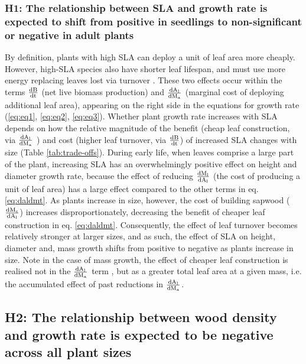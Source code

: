 \documentclass[a4paper,11pt]{article}
\begin{document}
\subsubsection*{H1: The relationship between SLA and growth rate is expected to shift from positive in seedlings to non-significant or negative in adult plants}

By definition, plants with high SLA can deploy a unit of leaf area more cheaply. However, high-SLA species also have shorter leaf lifespan, and must use more energy replacing leaves lost via turnover \citep{Wright:2004jb}. These two effects occur within the terms  $\frac{\rm{d} B}{\rm{d} t}$ (net live biomass production) and $\frac{\rm{d} A_{\rm l}}{\rm{d} M_{\rm a} }$ (marginal cost of deploying additional leaf area), appearing on the right side in the equations for growth rate (\ref{eq:eq1}, \ref{eq:eq2}, \ref{eq:eq3}). Whether plant growth rate increases with SLA depends on how the relative magnitude of the benefit (cheap leaf construction, via $\frac{\rm{d} A_{\rm l}}{\rm{d} M_{\rm a} }$ ) and cost (higher leaf turnover, via $\frac{\rm{d} B}{\rm{d} t}$) of increased SLA changes with size (Table \ref{tab:trade-offs}).
During early life, when leaves comprise a large part of the plant, increasing SLA has an overwhelmingly positive effect on height and diameter growth rate, because the effect of reducing $\frac{\rm{d} M_{\rm l}}{\rm{d} A_{\rm l}}$ (the cost of producing a unit of leaf area) has a large effect compared to the other terms in eq. \ref{eq:daldmt}. As plants increase in size, however, the cost of building sapwood ($\frac{\rm{d} M_{\rm s}}{\rm{d} A_{\rm l}}$) increases disproportionately, decreasing the benefit of cheaper leaf construction in eq.  \ref{eq:daldmt}. Consequently, the effect of leaf turnover becomes relatively stronger at larger sizes, and as such, the effect of SLA on height, diameter and, mass growth shifts from positive to negative as plants increase in size. Note in the case of mass growth, the effect of cheaper leaf construction is realised not in the $\frac{\rm{d} A_{\rm l}}{\rm{d} M_{\rm a} }$ term , but as a greater total leaf area at a given mass, i.e. the accumulated effect of past reductions in  $\frac{\rm{d} A_{\rm l}}{\rm{d} M_{\rm a} }$.

\subsection*{H2: The relationship between wood density and growth rate is expected to be negative across all plant sizes}
\end{document}
